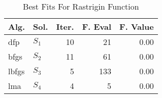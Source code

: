 \begin{table}
\centering
\caption{Best Fits For Rastrigin Function}
\label{solutions:rastrigin4d}
\begin{tabular}{llrrr}
\toprule
 Alg. &    Sol. &  Iter. &  F. Eval &  F. Value \\
\midrule
  dfp & $S_{1}$ &     10 &       21 &      0.00 \\
 bfgs & $S_{2}$ &     11 &       61 &      0.00 \\
lbfgs & $S_{3}$ &      5 &      133 &      0.00 \\
  lma & $S_{4}$ &      4 &        5 &      0.00 \\
\bottomrule
\end{tabular}
\end{table}

